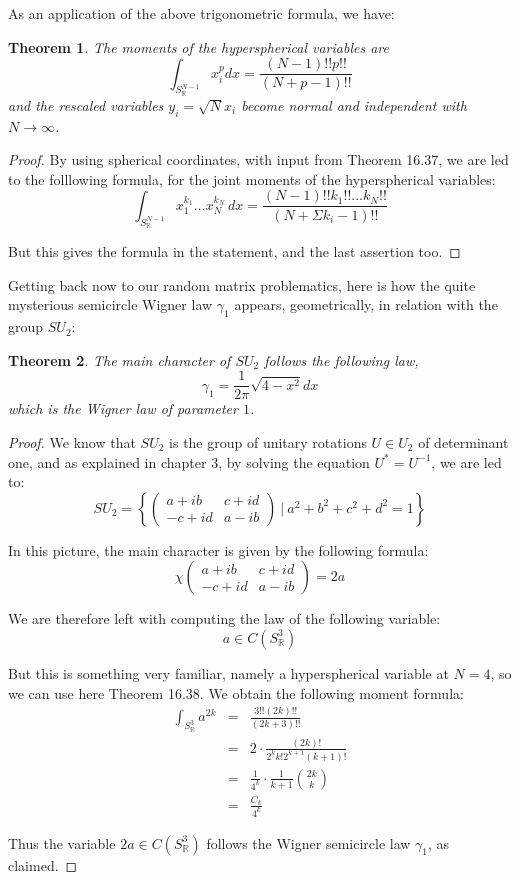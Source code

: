 \documentclass[12pt]{amsbook}
\newtheorem{theorem}{Theorem}[chapter]
\begin{document}
As an application of the above trigonometric formula, we have:

\begin{theorem}
The moments of the hyperspherical variables are
$$\int_{S^{N-1}_\mathbb R}x_i^pdx=\frac{(N-1)!!p!!}{(N+p-1)!!}$$
and the rescaled variables $y_i=\sqrt{N}x_i$ become normal and independent with $N\to\infty$.
\end{theorem}

\begin{proof}
By using spherical coordinates, with input from Theorem 16.37, we are led to the folllowing formula, for the joint moments of the hyperspherical variables:
$$\int_{S^{N-1}_\mathbb R}x_1^{k_1}\ldots x_N^{k_N}\,dx
=\frac{(N-1)!!k_1!!\ldots k_N!!}{(N+\Sigma k_i-1)!!}$$

But this gives the formula in the statement, and the last assertion too.
\end{proof}

Getting back now to our random matrix problematics, here is how the quite mysterious semicircle Wigner law $\gamma_1$ appears, geometrically, in relation with the group $SU_2$: 

\begin{theorem}
The main character of $SU_2$ follows the following law,
$$\gamma_1=\frac{1}{2\pi}\sqrt{4-x^2}dx$$
which is the Wigner law of parameter $1$.
\end{theorem}

\begin{proof}
We know that $SU_2$ is the group of unitary rotations $U\in U_2$ of determinant one, and as explained in chapter 3, by solving the equation $U^*=U^{-1}$, we are led to:
$$SU_2=\left\{\begin{pmatrix}a+ib&c+id\\ -c+id&a-ib\end{pmatrix}\ \Big|\ a^2+b^2+c^2+d^2=1\right\}$$

In this picture, the main character is given by the following formula:
$$\chi\begin{pmatrix}a+ib&c+id\\ -c+id&a-ib\end{pmatrix}=2a$$

We are therefore left with computing the law of the following variable:
$$a\in C(S^3_\mathbb R)$$

But this is something very familiar, namely a hyperspherical variable at $N=4$, so we can use here Theorem 16.38. We obtain the following moment formula:
\begin{eqnarray*}
\int_{S^3_\mathbb R}a^{2k}
&=&\frac{3!!(2k)!!}{(2k+3)!!}\\
&=&2\cdot\frac{(2k)!}{2^kk!2^{k+1}(k+1)!}\\
&=&\frac{1}{4^k}\cdot\frac{1}{k+1}\binom{2k}{k}\\
&=&\frac{C_k}{4^k}
\end{eqnarray*}

Thus the variable $2a\in C(S^3_\mathbb R)$ follows the Wigner semicircle law $\gamma_1$, as claimed.
\end{proof}
\end{document}
